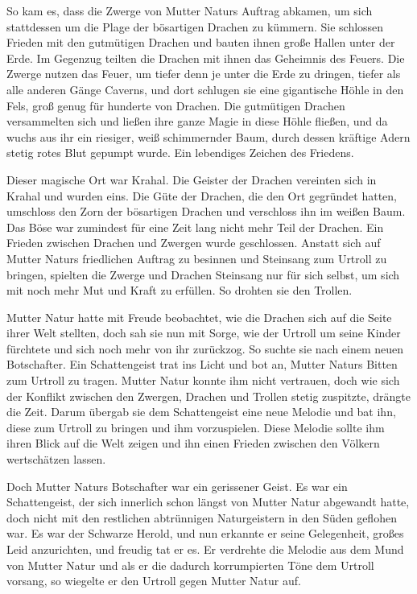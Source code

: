 \documentclass[10pt, a4paper, oneside]{book}
\begin{document}
So kam es, dass die Zwerge von Mutter Naturs Auftrag abkamen, um sich stattdessen um die Plage der bösartigen Drachen zu kümmern. Sie schlossen Frieden mit den gutmütigen Drachen und bauten ihnen große Hallen unter der Erde. Im Gegenzug teilten die Drachen mit ihnen das Geheimnis des Feuers. Die Zwerge nutzen das Feuer, um tiefer denn je unter die Erde zu dringen, tiefer als alle anderen Gänge Caverns, und dort schlugen sie eine gigantische Höhle in den Fels, groß genug für hunderte von Drachen. Die gutmütigen Drachen versammelten sich und ließen ihre ganze Magie in diese Höhle fließen, und da wuchs aus ihr ein riesiger, weiß schimmernder Baum, durch dessen kräftige Adern stetig rotes Blut gepumpt wurde. Ein lebendiges Zeichen des Friedens.

Dieser magische Ort war Krahal. Die Geister der Drachen vereinten sich in Krahal und wurden eins. Die Güte der Drachen, die den Ort gegründet hatten, umschloss den Zorn der bösartigen Drachen und verschloss ihn im weißen Baum. Das Böse war zumindest für eine Zeit lang nicht mehr Teil der Drachen. Ein Frieden zwischen Drachen und Zwergen wurde geschlossen. Anstatt sich auf Mutter Naturs friedlichen Auftrag zu besinnen und Steinsang zum Urtroll zu bringen, spielten die Zwerge und Drachen Steinsang nur für sich selbst, um sich mit noch mehr Mut und Kraft zu erfüllen. So drohten sie den Trollen.

Mutter Natur hatte mit Freude beobachtet, wie die Drachen sich auf die Seite ihrer Welt stellten, doch sah sie nun mit Sorge, wie der Urtroll um seine Kinder fürchtete und sich noch mehr von ihr zurückzog. So suchte sie nach einem neuen Botschafter. Ein Schattengeist trat ins Licht und bot an, Mutter Naturs Bitten zum Urtroll zu tragen. Mutter Natur konnte ihm nicht vertrauen, doch wie sich der Konflikt zwischen den Zwergen, Drachen und Trollen stetig zuspitzte, drängte die Zeit. Darum übergab sie dem Schattengeist eine neue Melodie und bat ihn, diese zum Urtroll zu bringen und ihm vorzuspielen. Diese Melodie sollte ihm ihren Blick auf die Welt zeigen und ihn einen Frieden zwischen den Völkern wertschätzen lassen.

Doch Mutter Naturs Botschafter war ein gerissener Geist. Es war ein Schattengeist, der sich innerlich schon längst von Mutter Natur abgewandt hatte, doch nicht mit den restlichen abtrünnigen Naturgeistern in den Süden geflohen war. Es war der Schwarze Herold, und nun erkannte er seine Gelegenheit, großes Leid anzurichten, und freudig tat er es. Er verdrehte die Melodie aus dem Mund von Mutter Natur und als er die dadurch korrumpierten Töne dem Urtroll vorsang, so wiegelte er den Urtroll gegen Mutter Natur auf.
\end{document}
